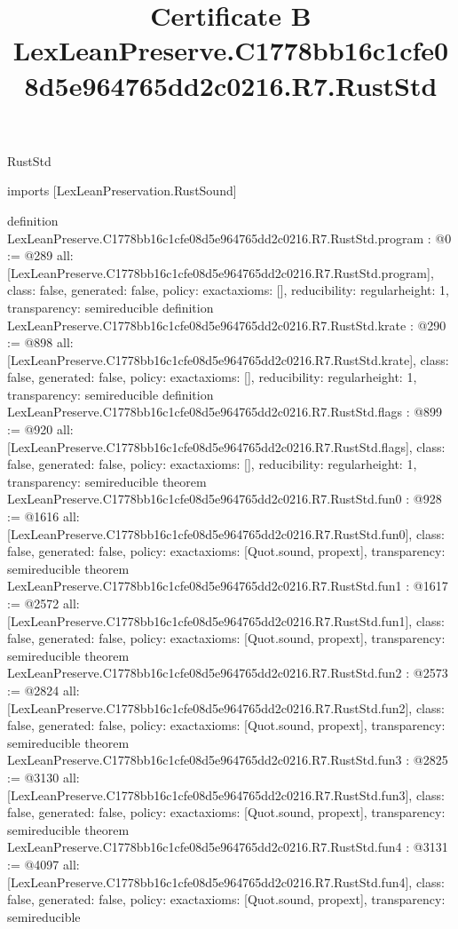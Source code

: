\begin{lexlean}{RustStd}
\title{Certificate B LexLeanPreserve.C1778bb16c1cfe08d5e964765dd2c0216.R7.RustStd}
\begin{coremodule}
imports [LexLeanPreservation.RustSound]

definition LexLeanPreserve.C1778bb16c1cfe08d5e964765dd2c0216.R7.RustStd.program : @0 := @289 {
  all: [LexLeanPreserve.C1778bb16c1cfe08d5e964765dd2c0216.R7.RustStd.program],
  class: false,
  generated: false,
  policy: exact{axioms: []},
  reducibility: regular{height: 1},
  transparency: semireducible
}
definition LexLeanPreserve.C1778bb16c1cfe08d5e964765dd2c0216.R7.RustStd.krate : @290 := @898 {
  all: [LexLeanPreserve.C1778bb16c1cfe08d5e964765dd2c0216.R7.RustStd.krate],
  class: false,
  generated: false,
  policy: exact{axioms: []},
  reducibility: regular{height: 1},
  transparency: semireducible
}
definition LexLeanPreserve.C1778bb16c1cfe08d5e964765dd2c0216.R7.RustStd.flags : @899 := @920 {
  all: [LexLeanPreserve.C1778bb16c1cfe08d5e964765dd2c0216.R7.RustStd.flags],
  class: false,
  generated: false,
  policy: exact{axioms: []},
  reducibility: regular{height: 1},
  transparency: semireducible
}
theorem LexLeanPreserve.C1778bb16c1cfe08d5e964765dd2c0216.R7.RustStd.fun0 : @928 := @1616 {
  all: [LexLeanPreserve.C1778bb16c1cfe08d5e964765dd2c0216.R7.RustStd.fun0],
  class: false,
  generated: false,
  policy: exact{axioms: [Quot.sound, propext]},
  transparency: semireducible
}
theorem LexLeanPreserve.C1778bb16c1cfe08d5e964765dd2c0216.R7.RustStd.fun1 : @1617 := @2572 {
  all: [LexLeanPreserve.C1778bb16c1cfe08d5e964765dd2c0216.R7.RustStd.fun1],
  class: false,
  generated: false,
  policy: exact{axioms: [Quot.sound, propext]},
  transparency: semireducible
}
theorem LexLeanPreserve.C1778bb16c1cfe08d5e964765dd2c0216.R7.RustStd.fun2 : @2573 := @2824 {
  all: [LexLeanPreserve.C1778bb16c1cfe08d5e964765dd2c0216.R7.RustStd.fun2],
  class: false,
  generated: false,
  policy: exact{axioms: [Quot.sound, propext]},
  transparency: semireducible
}
theorem LexLeanPreserve.C1778bb16c1cfe08d5e964765dd2c0216.R7.RustStd.fun3 : @2825 := @3130 {
  all: [LexLeanPreserve.C1778bb16c1cfe08d5e964765dd2c0216.R7.RustStd.fun3],
  class: false,
  generated: false,
  policy: exact{axioms: [Quot.sound, propext]},
  transparency: semireducible
}
theorem LexLeanPreserve.C1778bb16c1cfe08d5e964765dd2c0216.R7.RustStd.fun4 : @3131 := @4097 {
  all: [LexLeanPreserve.C1778bb16c1cfe08d5e964765dd2c0216.R7.RustStd.fun4],
  class: false,
  generated: false,
  policy: exact{axioms: [Quot.sound, propext]},
  transparency: semireducible
}
\end{coremodule}
\end{lexlean}
